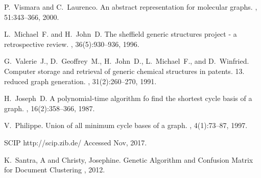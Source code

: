\documentclass[10pt,letterpaper]{article}
\begin{document}
\begin{thebibliography}{10}
P.~Vismara and C.~Laurenco.
\newblock An abstract representation for molecular graphs.
,
  51:343--366, 2000.

L.~Michael~F. and H.~John~D.
\newblock The sheffield generic structures project - a retrospective review.
, 36(5):930--936, 1996.

G.~Valerie~J., D.~Geoffrey~M., H.~John~D., L.~Michael~F., and D.~Winfried.
\newblock Computer storage and retrieval of generic chemical structures in
  patents. 13. reduced graph generation.
, 31(2):260--270, 1991.


H.~Joseph~D.
\newblock A polynomial-time algorithm fo find the shortest cycle basis of a
  graph.
, 16(2):358--366, 1987.

V.~Philippe.
\newblock Union of all minimum cycle bases of a graph.
, 4(1):73--87, 1997.

SCIP http://scip.zib.de/
\newblock Accessed Nov, 2017.


K.~Santra, A and Christy, Josephine.
\newblock Genetic Algorithm and Confusion Matrix for Document Clustering
, 2012.

\end{thebibliography}
\end{document}
